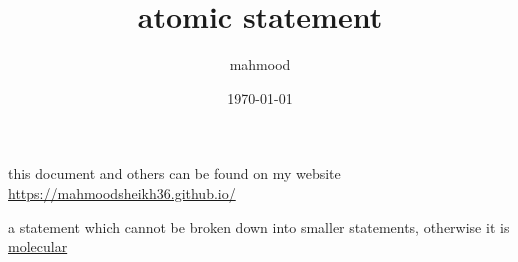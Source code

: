 \documentclass[a4paper,12pt]{article}
\author{mahmood}
\date{\today}
\title{atomic statement}
\begin{document}
\maketitle
\begin{note}
this document and others can be found on my website\\
\url{https://mahmoodsheikh36.github.io/}
\end{note}
\begin{definition}
a statement which cannot be broken down into smaller statements, otherwise it is \href{20230401175827-molecular_statement.org}{molecular}\\
\end{definition}
\end{document}
